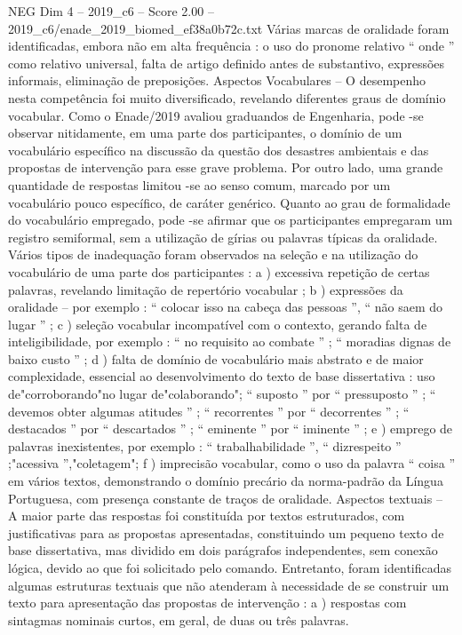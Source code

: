\begin{textsample}{NEG Dim 4 – 2019\_c6 – Score 2.00 – 2019\_c6/enade\_2019\_biomed\_ef38a0b72c.txt}
Várias marcas de oralidade foram identificadas, embora não em alta frequência : o uso do pronome relativo “ onde ” como relativo universal, falta de artigo definido antes de substantivo, expressões informais, eliminação de preposições.
Aspectos Vocabulares – O desempenho nesta competência foi muito diversificado, revelando diferentes graus de domínio vocabular.
Como o Enade/2019 avaliou graduandos de Engenharia, pode -se observar nitidamente, em uma parte dos participantes, o domínio de um vocabulário específico na discussão da questão dos desastres ambientais e das propostas de intervenção para esse grave problema.
Por outro lado, uma grande quantidade de respostas limitou -se ao senso comum, marcado por um vocabulário pouco específico, de caráter genérico.
Quanto ao grau de formalidade do vocabulário empregado, pode -se afirmar que os participantes empregaram um registro semiformal, sem a utilização de gírias ou palavras típicas da oralidade.
Vários tipos de inadequação foram observados na seleção e na utilização do vocabulário de uma parte dos participantes : a ) excessiva repetição de certas palavras, revelando limitação de repertório vocabular ; b ) expressões da oralidade – por exemplo : “ colocar isso na cabeça das pessoas ”, “ não saem do lugar ” ; c ) seleção vocabular incompatível com o contexto, gerando falta de inteligibilidade, por exemplo : “ no requisito ao combate ” ; “ moradias dignas de baixo custo ” ; d ) falta de domínio de vocabulário mais abstrato e de maior complexidade, essencial ao desenvolvimento do texto de base dissertativa : uso de"corroborando"no lugar de"colaborando"; “ suposto ” por “ pressuposto ” ; “ devemos obter algumas atitudes ” ; “ recorrentes ” por “ decorrentes ” ; “ destacados ” por “ descartados ” ; “ eminente ” por “ iminente ” ; e ) emprego de palavras inexistentes, por exemplo : “ trabalhabilidade ”, “ dizrespeito ” ;"acessiva ”,"coletagem"; f ) imprecisão vocabular, como o uso da palavra “ coisa ” em vários textos, demonstrando o domínio precário da norma-padrão da Língua Portuguesa, com presença constante de traços de oralidade.
Aspectos textuais – A maior parte das respostas foi constituída por textos estruturados, com justificativas para as propostas apresentadas, constituindo um pequeno texto de base dissertativa, mas dividido em dois parágrafos independentes, sem conexão lógica, devido ao que foi solicitado pelo comando.
Entretanto, foram identificadas algumas estruturas textuais que não atenderam à necessidade de se construir um texto para apresentação das propostas de intervenção : a ) respostas com sintagmas nominais curtos, em geral, de duas ou três palavras.

\end{textsample}
